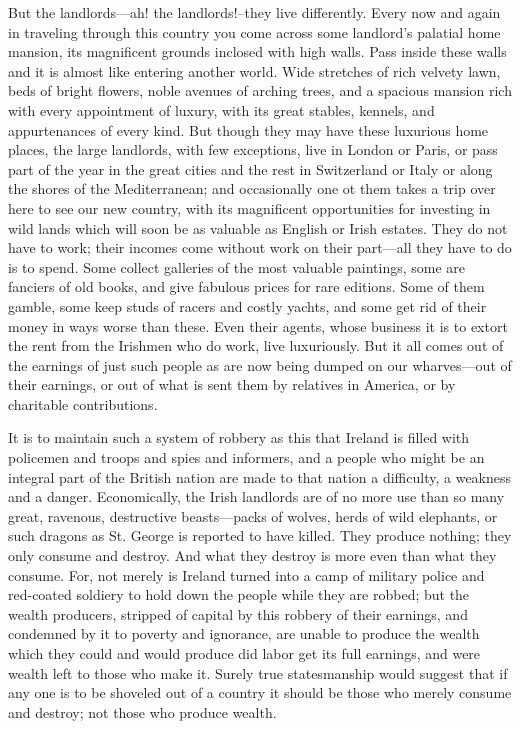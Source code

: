 \documentclass{book}
\begin{document}
But the landlords—ah! the landlords!–they live differently. Every now and again in traveling through this country you come across some landlord’s palatial home mansion, its magnificent grounds inclosed with high walls. Pass inside these walls and it is almost like entering another world. Wide stretches of rich velvety lawn, beds of bright flowers, noble avenues of arching trees, and a spacious mansion rich with every appointment of luxury, with its great stables, kennels, and appurtenances of every kind. But though they may have these luxurious home places, the large landlords, with few exceptions, live in London or Paris, or pass part of the year in the great cities and the rest in Switzerland or Italy or along the shores of the Mediterranean; and occasionally one ot them takes a trip over here to see our new country, with its magnificent opportunities for investing in wild lands which will soon be as valuable as English or Irish estates. They do not have to work; their incomes come without work on their part—all they have to do is to spend. Some collect galleries of the most valuable paintings, some are fanciers of old books, and give fabulous prices for rare editions. Some of them gamble, some keep studs of racers and costly yachts, and some get rid of their money in ways worse than these. Even their agents, whose business it is to extort the rent from the Irishmen who do work, live luxuriously. But it all comes out of the earnings of just such people as are now being dumped on our wharves—out of their earnings, or out of what is sent them by relatives in America, or by charitable contributions.

It is to maintain such a system of robbery as this that Ireland is filled with policemen and troops and spies and informers, and a people who might be an integral part of the British nation are made to that nation a difficulty, a weakness and a danger. Economically, the Irish landlords are of no more use than so many great, ravenous, destructive beasts—packs of wolves, herds of wild elephants, or such dragons as St. George is reported to have killed. They produce nothing; they only consume and destroy. And what they destroy is more even than what they consume. For, not merely is Ireland turned into a camp of military police and red-coated soldiery to hold down the people while they are robbed; but the wealth producers, stripped of capital by this robbery of their earnings, and condemned by it to poverty and ignorance, are unable to produce the wealth which they could and would produce did labor get its full earnings, and were wealth left to those who make it. Surely true statesmanship would suggest that if any one is to be shoveled out of a country it should be those who merely consume and destroy; not those who produce wealth.
\end{document}
